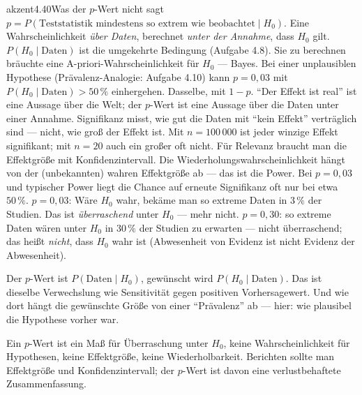 \begin{loesungkarte}{akzent}{4.40}{Was der $p$-Wert nicht sagt}
$p = P(\text{Teststatistik mindestens so extrem wie beobachtet}\mid H_0)$. Eine Wahrscheinlichkeit \emph{über Daten}, berechnet \emph{unter der Annahme}, dass $H_0$ gilt.
$P(H_0\mid\text{Daten})$ ist die umgekehrte Bedingung (Aufgabe 4.8). Sie zu berechnen bräuchte eine A-priori-Wahrscheinlichkeit für $H_0$ --- Bayes. Bei einer unplausiblen Hypothese (Prävalenz-Analogie: Aufgabe 4.10) kann $p = 0{,}03$ mit $P(H_0\mid\text{Daten}) > 50\,\%$ einhergehen.
Dasselbe, mit $1 - p$. \enquote{Der Effekt ist real} ist eine Aussage über die Welt; der $p$-Wert ist eine Aussage über die Daten unter einer Annahme.
Signifikanz misst, wie gut die Daten mit \enquote{kein Effekt} verträglich sind --- nicht, wie groß der Effekt ist. Mit $n = 100\,000$ ist jeder winzige Effekt signifikant; mit $n = 20$ auch ein großer oft nicht. Für Relevanz braucht man die Effektgröße mit Konfidenzintervall.
Die Wiederholungswahrscheinlichkeit hängt von der (unbekannten) wahren Effektgröße ab --- das ist die Power. Bei $p = 0{,}03$ und typischer Power liegt die Chance auf erneute Signifikanz oft nur bei etwa $50\,\%$.
$p = 0{,}03$: Wäre $H_0$ wahr, bekäme man so extreme Daten in $3\,\%$ der Studien. Das ist \emph{überraschend} unter $H_0$ --- mehr nicht. $p = 0{,}30$: so extreme Daten wären unter $H_0$ in $30\,\%$ der Studien zu erwarten --- nicht überraschend; das heißt \emph{nicht}, dass $H_0$ wahr ist (Abwesenheit von Evidenz ist nicht Evidenz der Abwesenheit).
\begin{fehler}\kastentext
Der $p$-Wert ist $P(\text{Daten}\mid H_0)$, gewünscht wird $P(H_0\mid\text{Daten})$. Das ist dieselbe Verwechslung wie Sensitivität gegen positiven Vorhersagewert. Und wie dort hängt die gewünschte Größe von einer \enquote{Prävalenz} ab --- hier: wie plausibel die Hypothese vorher war.
\end{fehler}
\begin{mitnehmen}\kastentext
Ein $p$-Wert ist ein Maß für Überraschung unter $H_0$, keine Wahrscheinlichkeit für Hypothesen, keine Effektgröße, keine Wiederholbarkeit. Berichten sollte man Effektgröße und Konfidenzintervall; der $p$-Wert ist davon eine verlustbehaftete Zusammenfassung.
\end{mitnehmen}
\end{loesungkarte}

